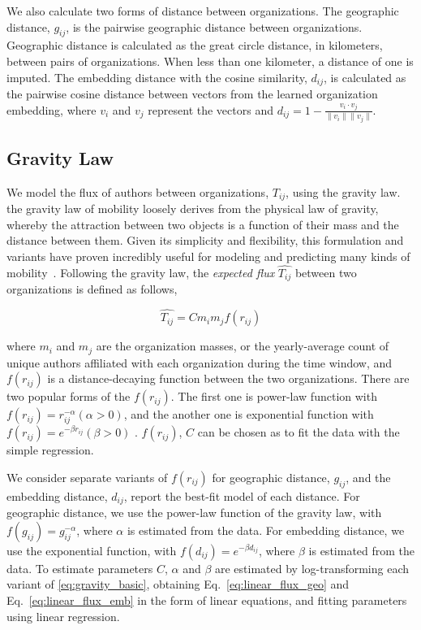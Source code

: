 \documentclass[12pt]{article} %
\begin{document}
We also calculate two forms of distance between organizations.
The geographic distance, $g_{ij}$, is the pairwise geographic distance between organizations.
Geographic distance is calculated as the great circle distance, in kilometers, between pairs of organizations.
When less than one kilometer, a distance of one is imputed.
The embedding distance with the cosine similarity, $d_{ij}$, is calculated as the pairwise cosine distance between vectors from the learned organization embedding, where $v_{i}$ and $v_{j}$ represent the vectors and $d_{ij} = 1 - \frac{v_{i} \cdot v_{j}}{\lVert v_{i} \rVert \lVert v_{j} \rVert}$.

%
%
\subsection*{Gravity Law}

We model the flux of authors between organizations, $T_{ij}$, using the gravity law.
the gravity law of mobility loosely derives from the physical law of gravity, whereby the attraction between two objects is a function of their mass and the distance between them.
Given its simplicity and flexibility, this formulation and variants have proven incredibly useful for modeling and predicting many kinds of mobility~\autocite{jung2008highwaygravity, curiel2018citygravity, lewer2008immigrationgravity, xia2005measlesgravity, truscott2012epidemicgravity, hong2016busgravity}.
Following the gravity law, the \textit{expected flux} $\hat{T_{ij}}$ between two organizations is defined as follows,

\begin{equation}
	\label{eq:gravity_basic}
	\hat{T_{ij}} = Cm_{i}m_{j}f(r_{ij})
\end{equation}

where $m_{i}$ and $m_{j}$ are the organization masses, or the yearly-average count of unique authors affiliated with each organization during the time window, and $f(r_{ij})$ is a distance-decaying function  between the two organizations. There are two popular forms of the $f(r_{ij})$. The first one is power-law function with $f(r_{ij})= r^{-\alpha}_{ij}  (\alpha > 0)$, and the another one is exponential function with $f(r_{ij}) = e^{-\beta r_{ij}} (\beta > 0)$ \autocite{chen2015distance}.  $f(r_{ij})$, $C$ can be chosen as to fit the data with the simple regression.

We consider separate variants of $f(r_{ij})$ for geographic distance, $g_{ij}$, and the embedding distance, $d_{ij}$, report the best-fit model of each distance.
For geographic distance, we use the power-law function of the gravity law, with $f(g_{ij})= g^{-\alpha}_{ij}$, where $\alpha$ is estimated from the data.
For embedding distance, we use the exponential function, with $f(d_{ij}) = e^{-\beta d_{ij}}$, where $\beta$ is estimated from the data.
To estimate parameters $C$, $\alpha$ and $\beta$ are estimated by log-transforming each variant of \ref{eq:gravity_basic}, obtaining Eq.~\ref{eq:linear_flux_geo} and Eq.~\ref{eq:linear_flux_emb} in the form of linear equations, and fitting parameters using linear regression.
\end{document}
